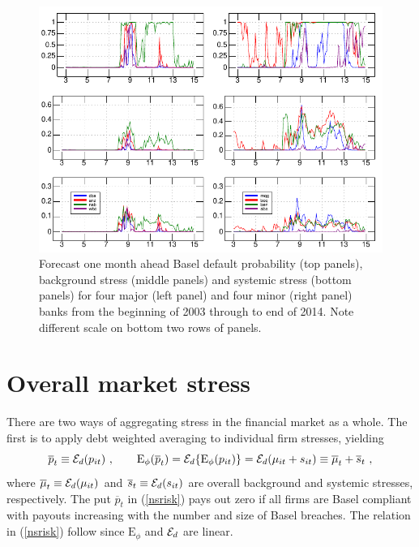 \documentclass[12pt]{article}
\newcommand{\E}{\mathrm{E}}
\newcommand{\Ex}{{\cal E}}
\newcommand{\Exd}{\Ex_d}
\newcommand{\Es}{\E_\phi}
\newcommand{\eref}[1]{(\ref{#1})}
\newcommand{\cq}{\ , \qquad}
\newcommand{\be}[1]{\begin{equation}\label{#1}}
\newcommand{\ee}{\end{equation}}
\begin{document}
 \begin{figure}[htbp]
\begin{center}
\includegraphics{figures/default.pdf}
\caption{Forecast one month ahead  Basel default probability (top panels), background stress (middle panels) and systemic stress (bottom panels) for  four major (left panel) and four minor (right panel)  banks from the beginning of 2003 through to end of 2014.  Note different scale on bottom two rows of panels.}\label{default}

\end{center}
\end{figure}


\section{Overall market stress}\label{aggregate}


There are two ways of aggregating stress in the financial market as a whole.  The first is to apply debt weighted averaging to individual firm stresses, yielding
\be{nsrisk}
\overline p_t \equiv \Exd(p_{it}) \cq \Es(\overline p_t)=\Exd\{\Es(p_{it})\} = \Exd(\mu_{it}+s_{it}) \equiv \overline\mu_{t}+\overline s_t \ ,
\ee
where $\overline\mu_{t}\equiv\Exd(\mu_{it})$ and $\overline s_{t}\equiv\Exd(s_{it})$ are overall background and systemic stresses, respectively. The put $\overline p_t$ in \eref{nsrisk} pays out zero if all firms are Basel compliant with payouts increasing with the number and size of Basel breaches. The relation in \eref{nsrisk} follow since  $\Es$ and $\Exd$ are linear.
\end{document}
